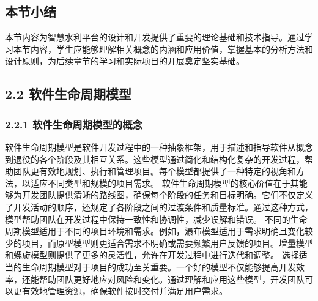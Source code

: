 \subsection{本节小结}\label{ux672cux8282ux5c0fux7ed3}
本节内容为智慧水利平台的设计和开发提供了重要的理论基础和技术指导。通过学习本节内容，学生应能够理解相关概念的内涵和应用价值，掌握基本的分析方法和设计原则，为后续章节的学习和实际项目的开展奠定坚实基础。 \subsection{2.2
软件生命周期模型}\label{ux8f6fux4ef6ux751fux547dux5468ux671fux6a21ux578b} \subsubsection{2.2.1
软件生命周期模型的概念}\label{ux8f6fux4ef6ux751fux547dux5468ux671fux6a21ux578bux7684ux6982ux5ff5}
软件生命周期模型是软件开发过程中的一种抽象框架，用于描述和指导软件从概念到退役的各个阶段及其相互关系。这些模型通过简化和结构化复杂的开发过程，帮助团队更有效地规划、执行和管理项目。每个模型都提供了一种特定的视角和方法，以适应不同类型和规模的项目需求。
软件生命周期模型的核心价值在于其能够为开发团队提供清晰的路线图，确保每个阶段的任务和目标明确。它们不仅定义了开发活动的顺序，还规定了各阶段之间的过渡条件和质量标准。通过这种方式，模型帮助团队在开发过程中保持一致性和协调性，减少误解和错误。
不同的生命周期模型适用于不同的项目环境和需求。例如，瀑布模型适用于需求明确且变化较少的项目，而原型模型则更适合需求不明确或需要频繁用户反馈的项目。增量模型和螺旋模型则提供了更多的灵活性，允许在开发过程中进行迭代和调整。
选择适当的生命周期模型对于项目的成功至关重要。一个好的模型不仅能够提高开发效率，还能帮助团队更好地应对风险和变化。通过理解和应用这些模型，开发团队可以更有效地管理资源，确保软件按时交付并满足用户需求。
